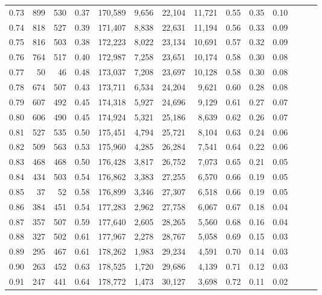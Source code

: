 \begin{tabular}{rrrrrrrrrrrrrr}
0.73 &    899 &    530 &  0.37 &  170,589 &    9,656 &  22,104 &  11,721 &  0.55 &  0.35 &      0.10 \\
0.74 &    818 &    527 &  0.39 &  171,407 &    8,838 &  22,631 &  11,194 &  0.56 &  0.33 &      0.09 \\
0.75 &    816 &    503 &  0.38 &  172,223 &    8,022 &  23,134 &  10,691 &  0.57 &  0.32 &      0.09 \\
0.76 &    764 &    517 &  0.40 &  172,987 &    7,258 &  23,651 &  10,174 &  0.58 &  0.30 &      0.08 \\
0.77 &     50 &     46 &  0.48 &  173,037 &    7,208 &  23,697 &  10,128 &  0.58 &  0.30 &      0.08 \\
0.78 &    674 &    507 &  0.43 &  173,711 &    6,534 &  24,204 &   9,621 &  0.60 &  0.28 &      0.08 \\
0.79 &    607 &    492 &  0.45 &  174,318 &    5,927 &  24,696 &   9,129 &  0.61 &  0.27 &      0.07 \\
0.80 &    606 &    490 &  0.45 &  174,924 &    5,321 &  25,186 &   8,639 &  0.62 &  0.26 &      0.07 \\
0.81 &    527 &    535 &  0.50 &  175,451 &    4,794 &  25,721 &   8,104 &  0.63 &  0.24 &      0.06 \\
0.82 &    509 &    563 &  0.53 &  175,960 &    4,285 &  26,284 &   7,541 &  0.64 &  0.22 &      0.06 \\
0.83 &    468 &    468 &  0.50 &  176,428 &    3,817 &  26,752 &   7,073 &  0.65 &  0.21 &      0.05 \\
0.84 &    434 &    503 &  0.54 &  176,862 &    3,383 &  27,255 &   6,570 &  0.66 &  0.19 &      0.05 \\
0.85 &     37 &     52 &  0.58 &  176,899 &    3,346 &  27,307 &   6,518 &  0.66 &  0.19 &      0.05 \\
0.86 &    384 &    451 &  0.54 &  177,283 &    2,962 &  27,758 &   6,067 &  0.67 &  0.18 &      0.04 \\
0.87 &    357 &    507 &  0.59 &  177,640 &    2,605 &  28,265 &   5,560 &  0.68 &  0.16 &      0.04 \\
0.88 &    327 &    502 &  0.61 &  177,967 &    2,278 &  28,767 &   5,058 &  0.69 &  0.15 &      0.03 \\
0.89 &    295 &    467 &  0.61 &  178,262 &    1,983 &  29,234 &   4,591 &  0.70 &  0.14 &      0.03 \\
0.90 &    263 &    452 &  0.63 &  178,525 &    1,720 &  29,686 &   4,139 &  0.71 &  0.12 &      0.03 \\
0.91 &    247 &    441 &  0.64 &  178,772 &    1,473 &  30,127 &   3,698 &  0.72 &  0.11 &      0.02 \\

\end{tabular}
